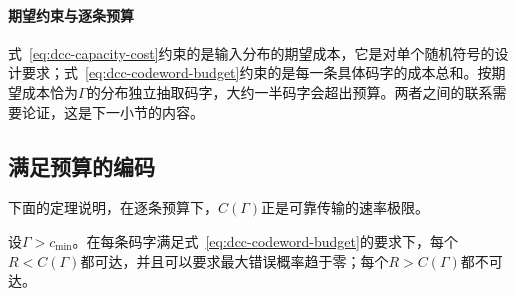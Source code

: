 \paragraph{期望约束与逐条预算}
式~\eqref{eq:dcc-capacity-cost}约束的是输入分布的期望成本，它是对单个随机符号的设计要求；式~\eqref{eq:dcc-codeword-budget}约束的是每一条具体码字的成本总和。按期望成本恰为$\Gamma$的分布独立抽取码字，大约一半码字会超出预算。两者之间的联系需要论证，这是下一小节的内容。

\subsection{满足预算的编码}
\label{sec:dcc-cost-coding}

下面的定理说明，在逐条预算下，$C(\Gamma)$正是可靠传输的速率极限。

\begin{theorem}[成本约束下的编码定理]
\label{thm:dcc-cost-coding}
设$\Gamma>c_{\min}$。在每条码字满足式~\eqref{eq:dcc-codeword-budget}的要求下，每个$R<C(\Gamma)$都可达，并且可以要求最大错误概率趋于零；每个$R>C(\Gamma)$都不可达。
\end{theorem}

